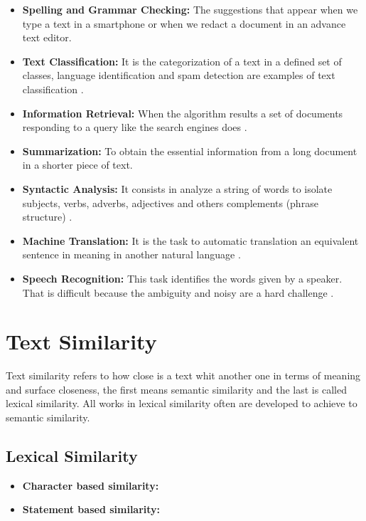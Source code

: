 \documentclass[12pt]{report}
\begin{document}
\begin{itemize}[nolistsep]
	\item \textbf{Spelling and Grammar Checking:} The suggestions that appear when we type a text in a smartphone or when we redact a document in an advance text editor. 
	
	\item \textbf{Text Classification:} It is the categorization of a text in a defined set of classes, language identification and spam detection are examples of text classification \cite{Russell2010}.
	
	\item \textbf{Information Retrieval:} When the algorithm results a set of documents responding to a query like the search engines does \cite{Russell2010}.
	
	\item \textbf{Summarization:} To obtain the essential information from a long document in a shorter piece of text.
	
	\item \textbf{Syntactic Analysis:} It consists in analyze a string of words to isolate subjects, verbs, adverbs, adjectives and others complements (phrase structure) \cite{Russell2010}.
	
	\item \textbf{Machine Translation:} It is the task to automatic translation an equivalent sentence in meaning in another natural language \cite{Goodfellow2016}.
	
	\item \textbf{Speech Recognition:} This task identifies the words given by a speaker. That is difficult because the ambiguity and noisy are a hard challenge \cite{Russell2010}.
	
\end{itemize}

\section{Text Similarity}
Text similarity refers to how close is a text whit another one in terms of meaning and surface closeness, the first means semantic similarity and the last is called lexical similarity. All works in lexical similarity often are developed to achieve to semantic similarity.

\subsection{Lexical Similarity}
\begin{itemize}[nolistsep]
	\item \textbf{Character based similarity:}
	\item \textbf{Statement based similarity:}
\end{itemize}
\end{document}
